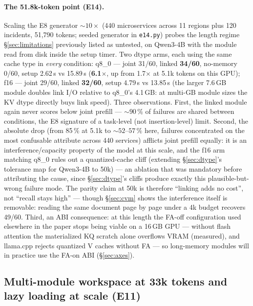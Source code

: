 \documentclass[11pt]{article}
\newcommand{\code}[1]{\texttt{#1}}
\begin{document}
\paragraph{The 51.8k-token point (E14).}
Scaling the E8 generator ${\sim}10\times$ (440 microservices across 11 regions plus 120 incidents, 51{,}790 tokens; seeded generator in \code{e14.py}) probes the length regime \S\ref{sec:limitations} previously listed as untested, on Qwen3-4B with the module read from disk inside the setup timer. Two dtype arms, each using the same cache type in \emph{every} condition: q8\_0 --- joint 31/60, linked \textbf{34/60}, no-memory 0/60, setup 2.62\,s vs 15.89\,s (\textbf{6.1$\times$}, up from 1.7$\times$ at 5.1k tokens on this GPU); f16 --- joint 29/60, linked \textbf{32/60}, setup 4.79\,s vs 13.85\,s (the larger 7.6\,GB module doubles link I/O relative to q8\_0's 4.1\,GB: at multi-GB module sizes the KV dtype directly buys link speed). Three observations. First, the linked module again never scores below joint prefill --- ${\sim}90\,\%$ of failures are shared between conditions, the E8 signature of a task-level (not insertion-level) limit. Second, the absolute drop (from 85\,\% at 5.1k to ${\sim}52$--$57\,\%$ here, failures concentrated on the most confusable attribute across 440 services) afflicts joint prefill equally: it is an interference/capacity property of the model at this scale, and the f16 arm matching q8\_0 rules out a quantized-cache cliff (extending \S\ref{sec:dtype}'s tolerance map for Qwen3-4B to 50k) --- an ablation that was mandatory before attributing the cause, since \S\ref{sec:dtype}'s cliffs produce exactly this plausible-but-wrong failure mode. The parity claim at 50k is therefore ``linking adds no cost'', not ``recall stays high'' --- though \S\ref{sec:cvm} shows the interference itself is removable: reading the same document page by page under a 4k budget recovers 49/60. Third, an ABI consequence: at this length the FA-off configuration used elsewhere in the paper stops being viable on a 16\,GB GPU --- without flash attention the materialized KQ scratch alone overflows VRAM (measured), and llama.cpp rejects quantized V caches without FA --- so long-memory modules will in practice use the FA-on ABI (\S\ref{sec:axes}).

\subsection{Multi-module workspace at 33k tokens and lazy loading at scale (E11)}
\label{sec:workspace}
\end{document}
